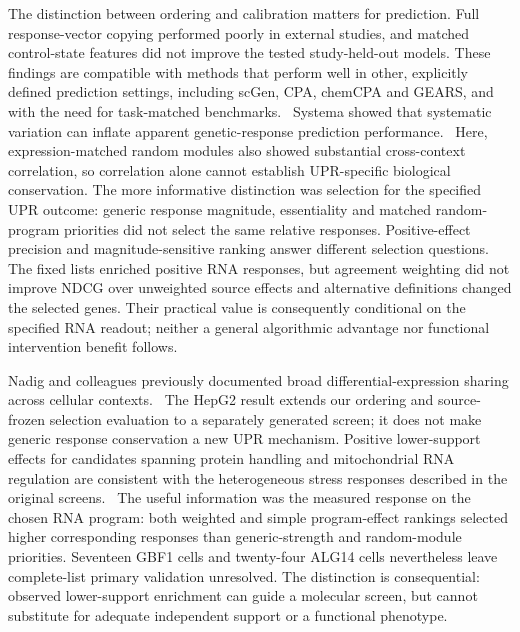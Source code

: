 \documentclass[a4paper,fleqn]{cas-sc}
\makeatletter
\DeclareRobustCommand{\rev}[1]{{\color{red}\def\@citecolor{black}\def\@linkcolor{red}\def\@urlcolor{red}#1}}
\let\unmarkedcite\cite
\renewcommand{\cite}[1]{{\color{black}\def\@citecolor{black}\unmarkedcite{#1}}}
\makeatother
\begin{document}
\rev{The distinction between ordering and calibration matters for prediction.} \rev{Full response-vector copying performed poorly in external studies, and matched control-state features did not improve the tested study-held-out models.} \rev{These findings are compatible with methods that perform well in other, explicitly defined prediction settings, including scGen, CPA, chemCPA and GEARS, and with the need for task-matched benchmarks.~\cite{scgen2019,cpa2023,chemcpa2022,gears2024,benchmark2026}} \rev{Systema showed that systematic variation can inflate apparent genetic-response prediction performance.~\cite{systema2026}} \rev{Here, expression-matched random modules also showed substantial cross-context correlation, so correlation alone cannot establish UPR-specific biological conservation.} \rev{The more informative distinction was selection for the specified UPR outcome: generic response magnitude, essentiality and matched random-program priorities did not select the same relative responses.} \rev{Positive-effect precision and magnitude-sensitive ranking answer different selection questions.} \rev{The fixed lists enriched positive RNA responses, but agreement weighting did not improve NDCG over unweighted source effects and alternative definitions changed the selected genes.} \rev{Their practical value is consequently conditional on the specified RNA readout; neither a general algorithmic advantage nor functional intervention benefit follows.}

\rev{Nadig and colleagues previously documented broad differential-expression sharing across cellular contexts.~\cite{nadig2025}} \rev{The HepG2 result extends our ordering and source-frozen selection evaluation to a separately generated screen; it does not make generic response conservation a new UPR mechanism.} \rev{Positive lower-support effects for candidates spanning protein handling and mitochondrial RNA regulation are consistent with the heterogeneous stress responses described in the original screens.~\cite{adamson2016,replogle2022}} \rev{The useful information was the measured response on the chosen RNA program: both weighted and simple program-effect rankings selected higher corresponding responses than generic-strength and random-module priorities.} \rev{Seventeen GBF1 cells and twenty-four ALG14 cells nevertheless leave complete-list primary validation unresolved.} \rev{The distinction is consequential: observed lower-support enrichment can guide a molecular screen, but cannot substitute for adequate independent support or a functional phenotype.}
\end{document}
